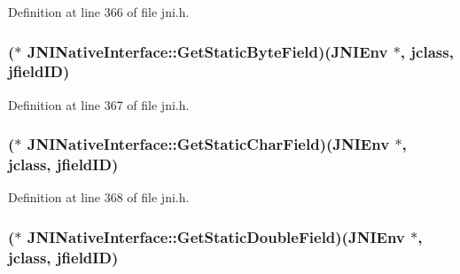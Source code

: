 Definition at line 366 of file jni.\-h.

\hypertarget{struct_j_n_i_native_interface_ab448bce554c4b9e505833cf5f47addef}{
\subsubsection[{Get\-Static\-Byte\-Field}]{($\ast$ J\-N\-I\-Native\-Interface\-::\-Get\-Static\-Byte\-Field)({\bf J\-N\-I\-Env} $\ast$, {\bf jclass}, {\bf jfield\-I\-D})}}\label{struct_j_n_i_native_interface_ab448bce554c4b9e505833cf5f47addef}


Definition at line 367 of file jni.\-h.

\hypertarget{struct_j_n_i_native_interface_a36ea82e0616f8673a63270c42b09f206}{
\subsubsection[{Get\-Static\-Char\-Field}]{($\ast$ J\-N\-I\-Native\-Interface\-::\-Get\-Static\-Char\-Field)({\bf J\-N\-I\-Env} $\ast$, {\bf jclass}, {\bf jfield\-I\-D})}}\label{struct_j_n_i_native_interface_a36ea82e0616f8673a63270c42b09f206}


Definition at line 368 of file jni.\-h.

\hypertarget{struct_j_n_i_native_interface_a6da633149e8803dabc3c34ae87a65801}{
\subsubsection[{Get\-Static\-Double\-Field}]{($\ast$ J\-N\-I\-Native\-Interface\-::\-Get\-Static\-Double\-Field)({\bf J\-N\-I\-Env} $\ast$, {\bf jclass}, {\bf jfield\-I\-D})}}\label{struct_j_n_i_native_interface_a6da633149e8803dabc3c34ae87a65801}


